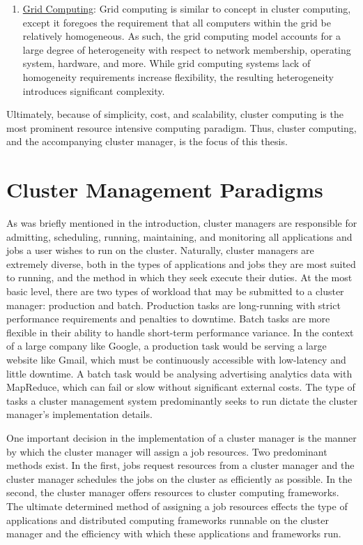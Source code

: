 \documentclass[twoside]{report}
\begin{document}
\begin{enumerate}
  \item \underline{Grid Computing}: Grid computing is similar to concept in
    cluster computing, except it foregoes the requirement that all computers
    within the grid be relatively homogeneous. As such, the grid computing model accounts
    for a large degree of heterogeneity with respect to network membership,
    operating system, hardware, and more.\cite[pg.
    18]{distributed-systems-principles-and-paradigms} While grid computing
    systems lack of homogeneity requirements increase flexibility,
    the resulting heterogeneity introduces significant complexity.

\end{enumerate}

Ultimately, because of simplicity, cost, and scalability, cluster computing is
the most prominent resource intensive computing paradigm. Thus, cluster
computing, and the accompanying cluster manager, is the focus of this
thesis.

\section{Cluster Management Paradigms}

As was briefly mentioned in the introduction, cluster managers are responsible
for admitting, scheduling, running, maintaining, and monitoring all applications
and jobs a user wishes to run on the cluster. Naturally, cluster managers are
extremely diverse, both in the types of applications and jobs they are most
suited to running, and the method in which they seek execute their duties.
At the most basic level, there are two types of workload that may be submitted
to a cluster manager: production and batch. Production tasks are long-running
with strict performance requirements and penalties to downtime. Batch tasks are
more flexible in their ability to handle short-term performance variance. In the
context of a large company like Google, a production task would be serving a
large website like Gmail, which must be continuously accessible with low-latency
and little downtime. A batch task would be analysing advertising analytics data
with MapReduce, which can fail or slow without significant external
costs.\cite[pg. 1]{borg} The type of tasks a cluster management system
predominantly seeks to run dictate the cluster manager's implementation details.

One important decision in the implementation of a cluster manager is the manner
by which the cluster manager will assign a job resources. Two predominant
methods exist. In the first, jobs request resources from a cluster manager and
the cluster manager schedules the jobs on the cluster as efficiently as
possible. In the second, the cluster manager offers resources to cluster
computing frameworks. The ultimate determined method of assigning a job
resources effects the type of applications and distributed computing frameworks
runnable on the cluster manager and the efficiency with which these applications
and frameworks run.
\end{document}
